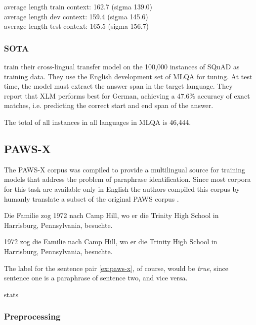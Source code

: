 average length train context: 162.7 (sigma 139.0) \\
average length dev context: 159.4 (sigma 145.6) \\
average length test context: 165.5 (sigma 156.7)

\subsubsection{SOTA}

\cite{lewis2019mlqa} train their cross-lingual transfer model on the 100,000 instances of SQuAD \cite{rajpurkar2016squad} as training data.
They use the English development set of MLQA for tuning.
At test time, the model must extract the answer span in the target language.
They report that XLM performs best for German, achieving a 47.6\% accuracy of exact matches, i.e. predicting the correct start and end span of the answer.

The total of all instances in all languages in MLQA is 46,444.

\subsection{PAWS-X}

The PAWS-X corpus \cite{yang2019paws} was compiled to provide a multilingual source for training models that address the problem of paraphrase identification. 
Since most corpora for this task are available only in English the authors compiled this corpus by humanly translate a subset of the original PAWS corpus \cite{zhang2019paws}.

\begin{examples}
	\label{ex:paws-x}
	\item Die Familie zog 1972 nach Camp Hill, wo er die Trinity High School in Harrisburg, Pennsylvania, besuchte.
		
	1972 zog die Familie nach Camp Hill, wo er die Trinity High School in Harrisburg, Pennsylvania, besuchte.
\end{examples}

The label for the sentence pair \ref{ex:paws-x}, of course, would be \emph{true}, since sentence one is a paraphrase of sentence two, and vice versa.


stats

\subsubsection{Preprocessing}

